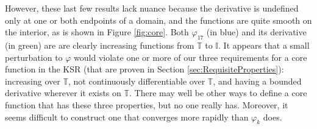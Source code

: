 However, these last few results lack nuance because the derivative is undefined only at one or both endpoints of a domain, and the functions are quite smooth on the interior, as is shown in Figure \ref{fig:core}. Both $\varphi_{17}$ (in blue) and its derivative (in green) are are clearly increasing functions from $\mathbb{T}$ to $\mathbb{I}$. It appears that a small perturbation to $\varphi$ would violate one or more of our three requirements for a core function in the KSR (that are proven in Section \ref{sec:RequisiteProperties}): increasing over $\mathbb{T}$, not continuously differentiable over $\mathbb{T}$, and having a bounded derivative wherever it exists on $\mathbb{T}$. There may well be other ways to define a core function that has these three properties, but no one really has. Moreover, it seems difficult to construct one that converges more rapidly than $\varphi_k$ does. 
